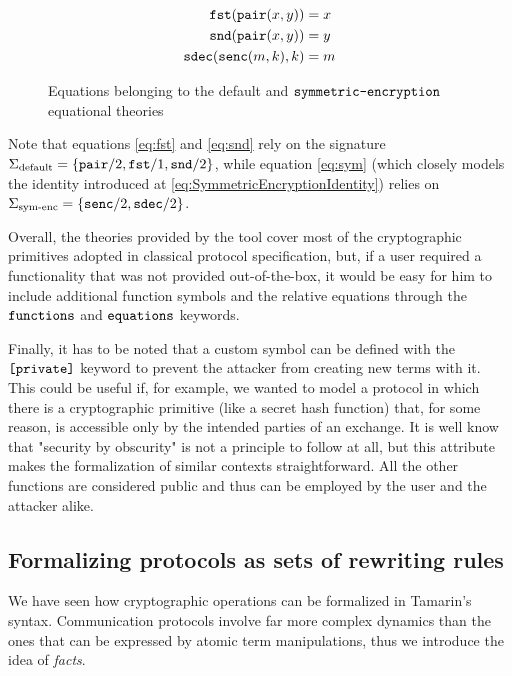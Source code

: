 \documentclass{article}
\newcommand{\mono}[1]{\textrm{\tt #1}}
\begin{document}
\begin{figure}
    \begin{align}
        \mono{fst}(\mono{pair}(x,y)) &= x \label{eq:fst}\\
        \mono{snd}(\mono{pair}(x,y)) &= y \label{eq:snd}\\
        \mono{sdec}(\mono{senc}(m, k), k) &= m \label{eq:sym}
    \end{align}
    \caption{Equations belonging to the default and $\mono{symmetric-encryption}$ equational theories}
\end{figure}

Note that equations \ref{eq:fst} and \ref{eq:snd} rely on the signature $\Sigma_\textrm{default} = \{\mono{pair}/2, \mono{fst}/1, \mono{snd}/2\}$, while equation \ref{eq:sym} (which closely models the identity introduced at \ref{eq:SymmetricEncryptionIdentity}) relies on $\Sigma_\textrm{sym-enc} = \{\mono{senc}/2, \mono{sdec}/2\}$. 

Overall, the theories provided by the tool cover most of the cryptographic primitives adopted in classical protocol specification, but, if a user required a functionality that was not provided out-of-the-box, it would be easy for him to include additional function symbols and the relative equations through the $\mono{functions}$ and $\mono{equations}$ keywords.

Finally, it has to be noted that a custom symbol can be defined with the $\mono{[private]}$ keyword to prevent the attacker from creating new terms with it. This could be useful if, for example, we wanted to model a protocol in which there is a cryptographic primitive (like a secret hash function) that, for some reason, is accessible only by the intended parties of an exchange. It is well know that "security by obscurity" is not a principle to follow at all, but this attribute makes the formalization of similar contexts straightforward. All the other functions are considered public and thus can be employed by the user and the attacker alike.

\subsection{Formalizing protocols as sets of rewriting rules}

We have seen how cryptographic operations can be formalized in Tamarin's syntax. Communication protocols involve far more complex dynamics than the ones that can be expressed by atomic term manipulations, thus we introduce the idea of \textit{facts}.
\end{document}
